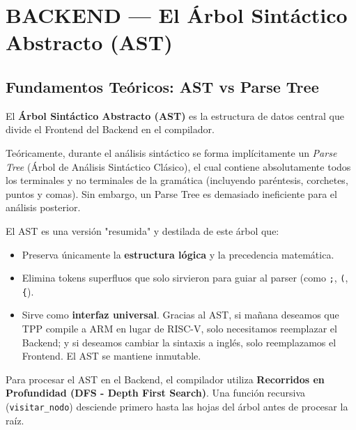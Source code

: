 \chapter{BACKEND — El Árbol Sintáctico Abstracto (AST)}

\section{Fundamentos Teóricos: AST vs Parse Tree}

El \textbf{Árbol Sintáctico Abstracto (AST)} es la estructura de datos central que divide el Frontend del Backend en el compilador. 

Teóricamente, durante el análisis sintáctico se forma implícitamente un \textit{Parse Tree} (Árbol de Análisis Sintáctico Clásico), el cual contiene absolutamente todos los terminales y no terminales de la gramática (incluyendo paréntesis, corchetes, puntos y comas). Sin embargo, un Parse Tree es demasiado ineficiente para el análisis posterior.

El AST es una versión "resumida" y destilada de este árbol que:
\begin{itemize}
    \item Preserva únicamente la \textbf{estructura lógica} y la precedencia matemática.
    \item Elimina tokens superfluos que solo sirvieron para guiar al parser (como \texttt{;}, \texttt{(}, \texttt{\{}).
    \item Sirve como \textbf{interfaz universal}. Gracias al AST, si mañana deseamos que TPP compile a ARM en lugar de RISC-V, solo necesitamos reemplazar el Backend; y si deseamos cambiar la sintaxis a inglés, solo reemplazamos el Frontend. El AST se mantiene inmutable.
\end{itemize}

Para procesar el AST en el Backend, el compilador utiliza \textbf{Recorridos en Profundidad (DFS - Depth First Search)}. Una función recursiva (\texttt{visitar\_nodo}) desciende primero hasta las hojas del árbol antes de procesar la raíz.


